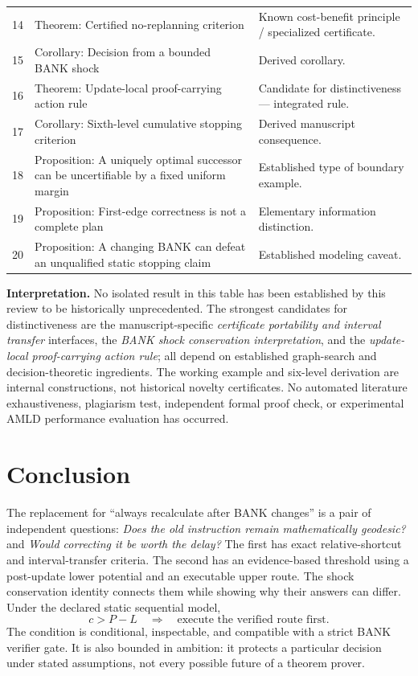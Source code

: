 \documentclass[11pt]{article}
\theoremstyle{definition}\newtheorem{definition}[theorem]{Definition}\newtheorem{assumption}[theorem]{Assumption}
\theoremstyle{remark}\newtheorem{remark}[theorem]{Remark}
\begin{document}
\begin{longtable}{@{}p{.045\linewidth}p{.415\linewidth}p{.44\linewidth}@{}}
14 & Theorem: Certified no-replanning criterion & Known cost-benefit principle / specialized certificate. \cite{ShekharDutta1989,RussellWefald1991,Korf1990} \\
15 & Corollary: Decision from a bounded BANK shock & Derived corollary. \cite{Bellman1958,ShekharDutta1989} \\
16 & Theorem: Update-local proof-carrying action rule & Candidate for distinctiveness --- integrated rule. \cite{GoldbergHarrelson2005,KoenigLikhachev2002,ShekharDutta1989,RussellWefald1991,Necula1997} \\
17 & Corollary: Sixth-level cumulative stopping criterion & Derived manuscript consequence. \cite{Bellman1958,KoenigLikhachevFurcy2004,ShekharDutta1989} \\
18 & Proposition: A uniquely optimal successor can be uncertifiable by a fixed uniform margin & Established type of boundary example. \cite{Hart1968} \\
19 & Proposition: First-edge correctness is not a complete plan & Elementary information distinction. \cite{Korf1990,ShekharDutta1989} \\
20 & Proposition: A changing BANK can defeat an unqualified static stopping claim & Established modeling caveat. \cite{Korf1990,ShekharDutta1989,KoenigLikhachev2002} \\
\bottomrule
\end{longtable}
\normalsize
\noindent\textbf{Interpretation.} No isolated result in this table has been established by this review to be historically unprecedented. The strongest candidates for distinctiveness are the manuscript-specific \emph{certificate portability and interval transfer} interfaces, the \emph{BANK shock conservation interpretation}, and the \emph{update-local proof-carrying action rule}; all depend on established graph-search and decision-theoretic ingredients. The working example and six-level derivation are internal constructions, not historical novelty certificates. No automated literature exhaustiveness, plagiarism test, independent formal proof check, or experimental AMLD performance evaluation has occurred.

\section{Conclusion}
The replacement for ``always recalculate after BANK changes'' is a pair of independent questions: \emph{Does the old instruction remain mathematically geodesic?} and \emph{Would correcting it be worth the delay?} The first has exact relative-shortcut and interval-transfer criteria. The second has an evidence-based threshold using a post-update lower potential and an executable upper route. The shock conservation identity connects them while showing why their answers can differ. Under the declared static sequential model,
\[
\boxed{c>P-L\quad\Longrightarrow\quad\text{execute the verified route first}.}
\]
The condition is conditional, inspectable, and compatible with a strict BANK verifier gate. It is also bounded in ambition: it protects a particular decision under stated assumptions, not every possible future of a theorem prover.
\end{document}
